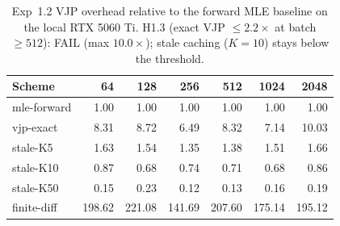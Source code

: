 \begin{table}[htbp]
\centering
\caption{Exp~1.2 VJP overhead relative to the forward MLE baseline on the local RTX 5060 Ti. H1.3 (exact VJP $\le 2.2\times$ at batch $\ge 512$): FAIL (max $10.0\times$); stale caching ($K=10$) stays below the threshold.}
\label{tab:h13}
\begin{tabular}{lrrrrrr}
\toprule
Scheme & 64 & 128 & 256 & 512 & 1024 & 2048 \\
\midrule
mle-forward & 1.00 & 1.00 & 1.00 & 1.00 & 1.00 & 1.00 \\
vjp-exact & 8.31 & 8.72 & 6.49 & 8.32 & 7.14 & 10.03 \\
stale-K5 & 1.63 & 1.54 & 1.35 & 1.38 & 1.51 & 1.66 \\
stale-K10 & 0.87 & 0.68 & 0.74 & 0.71 & 0.68 & 0.86 \\
stale-K50 & 0.15 & 0.23 & 0.12 & 0.13 & 0.16 & 0.19 \\
finite-diff & 198.62 & 221.08 & 141.69 & 207.60 & 175.14 & 195.12 \\
\bottomrule
\end{tabular}
\end{table}
